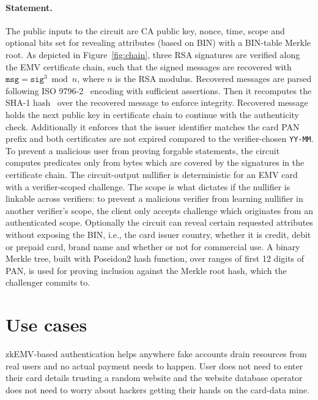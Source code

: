 \documentclass[10pt,a4paper]{article}
\begin{document}
\paragraph{Statement.}
The public inputs to the circuit are CA public key, nonce, time, scope and optional bits set for revealing attributes (based on BIN) with a BIN-table Merkle root.
As depicted in Figure~\ref{fig:chain}, three RSA signatures are verified along the EMV certificate chain, such that the signed messages are recovered with $\texttt{msg} = \texttt{sig} ^ 3 \bmod n$, where $n$ is the RSA modulus.
Recovered messages are parsed following ISO 9796-2~\cite{iso9796-2} encoding with sufficient assertions.
Then it recomputes the SHA-1 hash~\cite{fips180-4} over the recovered message to enforce integrity.
Recovered message holds the next public key in certificate chain to continue with the authenticity check.
Additionally it enforces that the issuer identifier matches the card PAN prefix and both certificates are not expired compared to the verifier-chosen \texttt{YY-MM}.
To prevent a malicious user from proving forgable statements, the circuit computes predicates only from bytes which are covered by the signatures in the certificate chain.
The circuit-output nullifier is deterministic for an EMV card with a verifier-scoped challenge.
The scope is what dictates if the nullifier is linkable across verifiers: to prevent a malicious verifier from learning nullifier in another verifier's scope, the client only accepts challenge which originates from an authenticated scope.
Optionally the circuit can reveal certain requested attributes without exposing the BIN, i.e., the card issuer country, whether it is credit, debit or prepaid card, brand name and whether or not for commercial use.
A binary Merkle tree, built with Poseidon2 hash function, over ranges of first 12 digits of PAN, is used for proving inclusion against the Merkle root hash, which the challenger commits to.

\section{Use cases}

zkEMV-based authentication helps anywhere fake accounts drain resources from real users and no actual payment needs to happen.
User does not need to enter their card details trusting a random website and the website database operator does not need to worry about hackers getting their hands on the card-data mine.
\end{document}
